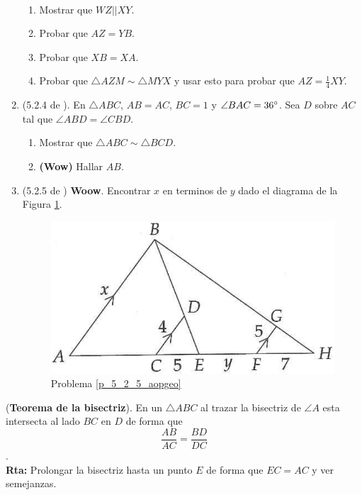 \begin{exer}{\ \\}
\begin{enumerate}
	
	\begin{enumerate}[label=\Alph*)]
		\item Mostrar que $WZ||XY$.
		\item Probar que $AZ=YB$.
		\item Probar que $XB=XA$.
		\item Probar que $\triangle AZM\sim \triangle MYX$ y usar esto para probar que $AZ=\frac{1}{4} XY$.
	\end{enumerate}

	\item (5.2.4 de \cite{Aops_Geometria}). En $\triangle ABC$, $AB=AC$, $BC=1$ y $\angle BAC = 36 \degree$. Sea $D$ sobre $AC$ tal que $\angle ABD = \angle CBD$.
	\begin{enumerate}[label=\Alph*)]
		\item Mostrar que $\triangle ABC\sim \triangle BCD$.
		\item\textbf{(Wow)} Hallar $AB$.
	\end{enumerate}
	
	\item \label{p_5_2_5_aopgeo} (5.2.5 de \cite{Aops_Geometria}) \textbf{Woow}. Encontrar $x$ en terminos de $y$ dado el diagrama de la Figura \ref{aops_geo_5_2_5}.
	\begin{figure}[H]
		\centering
		\includegraphics[width=0.5\linewidth]{Geometria/imgs/aops_geo_5_2_5}
		\caption{Problema \ref{p_5_2_5_aopgeo} }
		\label{aops_geo_5_2_5}
	\end{figure}
\end{enumerate}
	
\end{exer}

\newpage
\begin{ejemplo}
	\label{teorema_bisectriz}
	(\textbf{Teorema de la bisectriz}). En un $\triangle ABC$ al trazar la bisectriz de $\angle A $ esta intersecta al lado $BC$ en $D$ de forma que 
	\[
		\frac{AB}{AC}=\frac{BD}{DC}
	\].\\
	\textbf{Rta:} Prolongar la bisectriz hasta un punto $E$ de forma que $EC=AC$ y ver semejanzas.
\end{ejemplo}

